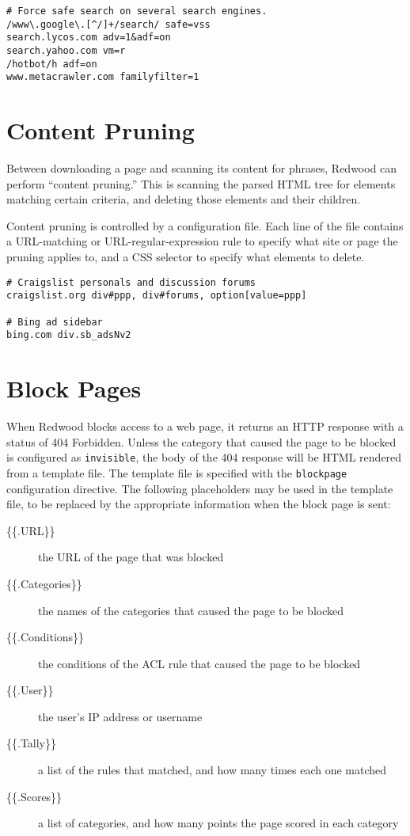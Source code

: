 \documentclass{article}
\begin{document}
\begin{verbatim}
# Force safe search on several search engines.
/www\.google\.[^/]+/search/ safe=vss
search.lycos.com adv=1&adf=on
search.yahoo.com vm=r
/hotbot/h adf=on
www.metacrawler.com familyfilter=1
\end{verbatim}

\section{Content Pruning}

Between downloading a page and scanning its content for phrases, 
Redwood can perform ``content pruning.'' 
This is scanning the parsed HTML tree for elements matching certain criteria,
and deleting those elements and their children.

Content pruning is controlled by a configuration file.
Each line of the file contains a URL-matching or URL-regular-expression rule
to specify what site or page the pruning applies to, 
and a CSS selector to specify what elements to delete.

\begin{verbatim}
# Craigslist personals and discussion forums
craigslist.org div#ppp, div#forums, option[value=ppp]

# Bing ad sidebar
bing.com div.sb_adsNv2
\end{verbatim}

\section{Block Pages}

When Redwood blocks access to a web page, 
it returns an HTTP response with a status of 404 Forbidden.
Unless the category that caused the page to be blocked is configured as \verb"invisible",
the body of the 404 response will be HTML rendered from a template file.
The template file is specified with the \verb"blockpage" configuration directive.
The following placeholders may be used in the template file, 
to be replaced by the appropriate information when the block page is sent:

\begin{description}

\item[\{\{.URL\}\}] the URL of the page that was blocked
\item[\{\{.Categories\}\}] the names of the categories that caused the page to be blocked
\item[\{\{.Conditions\}\}] the conditions of the ACL rule that caused the page to be blocked
\item[\{\{.User\}\}] the user's IP address or username
\item[\{\{.Tally\}\}] a list of the rules that matched, and how many times each one matched
\item[\{\{.Scores\}\}] a list of categories, and how many points the page scored in each category

\end{description}
\end{document}
